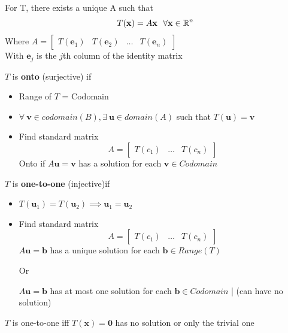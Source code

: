 \documentclass{report}
\begin{document}
\begin{theorem}
\end{theorem}
For T, there exists a unique A such that
\[
T(\mathbf{x}) = A \mathbf{x}\ \ \forall \mathbf{x} \in \mathbb{R}^n\\
\]
Where $A = \begin{bmatrix} T(\mathbf{e}_1) & T(\mathbf{e}_2) & \dots & T(\mathbf{e}_n) \end{bmatrix}$\\
With $\mathbf{e}_j$ is the $j$th column of the identity matrix


\begin{definition}
\end{definition}
$T$ is \textbf{onto} (surjective) if
\begin{itemize}
    \item Range of $T$ = Codomain
    \item $\forall \ \mathbf{v} \in codomain (B), \exists \
    \mathbf{u} \in domain (A)$ such that $T(\mathbf{u})=\mathbf{v}$
    \item Find standard matrix
    \[
    A = \begin{bmatrix}
        T(c_1) & \ldots & T(c_n)
    \end{bmatrix}
    \]
    Onto if $A \mathbf{u} = \mathbf{v}$ has a solution for each $\mathbf{v} \in Codomain$
\end{itemize}

\begin{definition}
\end{definition}
$T$ is \textbf{one-to-one} (injective)if
\begin{itemize}
    \item $T(\mathbf{u}_1) = T(\mathbf{u}_2) \implies \mathbf{u}_1 = \mathbf{u}_2$
    \item Find standard matrix
    \[
    A = \begin{bmatrix}
        T(c_1) & \ldots & T(c_n)
    \end{bmatrix}
    \]
    $A \mathbf{u} = \mathbf{b}$ has a unique solution for each $\mathbf{b} \in Range(T)$

    Or

    $A \mathbf{u} = \mathbf{b}$ has at most one solution for each $\mathbf{b} \in Codomain$ | (can have no solution)
\end{itemize}

\begin{theorem}
    $T$ is one-to-one iff $T(\mathbf{x}) = \mathbf{0}$ has no solution or only the trivial one
\end{theorem}
\end{document}
